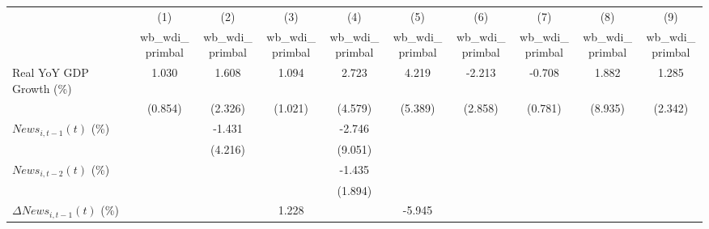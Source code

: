 {
\def\sym#1{\ifmmode^{#1}\else\(^{#1}\)\fi}
\begin{tabular}{l*{9}{c}}
\toprule
                    &\multicolumn{1}{c}{(1)}&\multicolumn{1}{c}{(2)}&\multicolumn{1}{c}{(3)}&\multicolumn{1}{c}{(4)}&\multicolumn{1}{c}{(5)}&\multicolumn{1}{c}{(6)}&\multicolumn{1}{c}{(7)}&\multicolumn{1}{c}{(8)}&\multicolumn{1}{c}{(9)}\\
                    &\multicolumn{1}{c}{wb_wdi_primbal}&\multicolumn{1}{c}{wb_wdi_primbal}&\multicolumn{1}{c}{wb_wdi_primbal}&\multicolumn{1}{c}{wb_wdi_primbal}&\multicolumn{1}{c}{wb_wdi_primbal}&\multicolumn{1}{c}{wb_wdi_primbal}&\multicolumn{1}{c}{wb_wdi_primbal}&\multicolumn{1}{c}{wb_wdi_primbal}&\multicolumn{1}{c}{wb_wdi_primbal}\\
\midrule
Real YoY GDP Growth (\%)&       1.030         &       1.608         &       1.094         &       2.723         &       4.219         &      -2.213         &      -0.708         &       1.882         &       1.285         \\
                    &     (0.854)         &     (2.326)         &     (1.021)         &     (4.579)         &     (5.389)         &     (2.858)         &     (0.781)         &     (8.935)         &     (2.342)         \\
\addlinespace
$ News_{i,t-1}(t)$ (\%)&                     &      -1.431         &                     &      -2.746         &                     &                     &                     &                     &                     \\
                    &                     &     (4.216)         &                     &     (9.051)         &                     &                     &                     &                     &                     \\
\addlinespace
$ News_{i,t-2}(t)$ (\%)&                     &                     &                     &      -1.435         &                     &                     &                     &                     &                     \\
                    &                     &                     &                     &     (1.894)         &                     &                     &                     &                     &                     \\
\addlinespace
$ \Delta News_{i,t-1}(t)$ (\%)&                     &                     &       1.228         &                     &      -5.945         &                     &                     &                     &                     \\

\end{tabular}}
